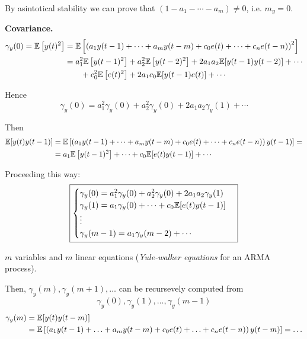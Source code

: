 By asintotical stability we can prove that $(1-a_1-\cdots-a_m)\neq0$, i.e. $m_{y}=0$.

\textbf{Covariance.}
\begin{align*}
	\gamma_{y}(0) = \mathbb{E}\left[y(t)^{2}\right]&=\mathbb{E}\left[\left(a_{1} y(t-1)+\cdots+a_{m} y(t-m)+c_{0} e(t)+\cdots+c_{n} e(t-n)\right)^{2}\right]\\
	&= a_{1}^{2} \mathbb{E}\left[y(t-1)^{2}\right]+a_{2}^{2} \mathbb{E}\left[y(t-2)^{2}\right]+2 a_{1} a_{2} \mathbb{E}[y(t-1) y(t-2)]+\cdots \\
	&\qquad+c_{0}^{2} \mathbb{E}\left[e(t)^{2}\right]+2 a_{1} c_{0} \mathbb{E}[y(t-1) e(t)]+\cdots
\end{align*}

Hence
$$
\gamma_{y}(0)=a_{1}^{2} \gamma_{y}(0)+a_{2}^{2} \gamma_{y}(0)+2 a_{1} a_{2} \gamma_{y}(1)+\cdots
$$

Then
\begin{align*}
	\mathbb{E}[y(t) y(t-1)]&=\mathbb{E}\left[\left(a_{1} y(t-1)+\cdots+a_{m} y(t-m)+c_{0} e(t)+\cdots+c_{n} e(t-n)\right) y(t-1)\right]= \\
	&=a_{1} \mathbb{E}\left[y(t-1)^{2}\right]+\cdots+c_{0} \mathbb{E}[e(t) y(t-1)]+\cdots
\end{align*}

Proceeding this way:
\[
	\boxed{
		\begin{cases}
			\gamma_{y}(0)=a_{1}^{2} \gamma_{y}(0)+a_{2}^{2} \gamma_{y}(0)+2 a_{1} a_{2} \gamma_{y}(1) \\
			\gamma_{y}(1)=a_{1} \gamma_{y}(0)+\cdots+c_{0} \mathbb{E}[e(t) y(t-1)] \\
			\vdots \\
			\gamma_{y}(m-1)=a_{1} \gamma_{y}(m-2)+\cdots
		\end{cases}
	}
\]

$m$ variables and $m$ linear equations (\emph{Yule-walker equations} for an ARMA process).

Then, $\gamma_{y}(m), \gamma_{y}(m+1), \ldots$ can be recursevely computed from
$$
\gamma_{y}(0), \gamma_{y}(1), \ldots, \gamma_{y}(m-1)
$$
\begin{align*}
	\gamma_{y}(m)&=\mathbb{E}[y(t) y(t-m)] \\
	&=\mathbb{E}\left[\left(a_{1} y(t-1)+\ldots+a_{m} y(t-m)+c_{0} e(t)+\ldots+c_{n} e(t-n)\right) y(t-m)\right]=\ldots
\end{align*}
